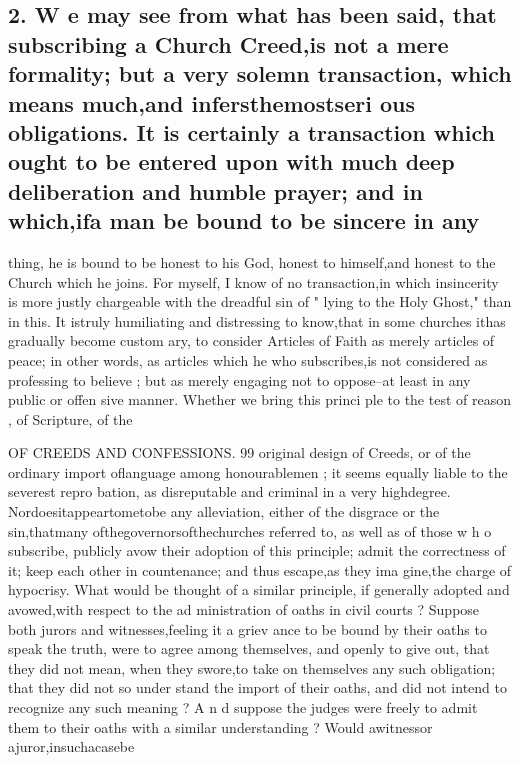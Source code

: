 \documentclass[
]{book}
\begin{document}
\hypertarget{w-e-may-see-from-what-has-been-said-that-subscribing-a-church-creedis-not-a-mere-formality-but-a-very-solemn-transaction-which-means-muchand-infersthemostseri-ous-obligations.-it-is-certainly-a-transaction-which-ought-to-be-entered-upon-with-much-deep-deliberation-and-humble-prayer-and-in-whichifa-man-be-bound-to-be-sincere-in-any}{%
\subsection{2. W e may see from what has been said, that subscribing a Church Creed,is not a mere formality; but a very solemn transaction, which means much,and infersthemostseri ous obligations. It is certainly a transaction which ought to be entered upon with much deep deliberation and humble prayer; and in which,ifa man be bound to be sincere in any}\label{w-e-may-see-from-what-has-been-said-that-subscribing-a-church-creedis-not-a-mere-formality-but-a-very-solemn-transaction-which-means-muchand-infersthemostseri-ous-obligations.-it-is-certainly-a-transaction-which-ought-to-be-entered-upon-with-much-deep-deliberation-and-humble-prayer-and-in-whichifa-man-be-bound-to-be-sincere-in-any}}

thing, he is bound to be honest to his God, honest to himself,and honest to the Church
which he joins. For myself, I know of no transaction,in which insincerity is more justly
chargeable with the dreadful sin of " lying to the Holy Ghost," than in this. It istruly
humiliating and distressing to know,that in some churches ithas gradually become custom ary, to consider Articles of Faith as merely articles of peace; in other words, as articles which he who subscribes,is not considered as professing to believe ; but as merely engaging not to oppose--at least in any public or offen sive manner. Whether we bring this princi
ple to the test of reason , of Scripture, of the

OF CREEDS AND CONFESSIONS. 99
original design of Creeds, or of the ordinary import oflanguage among honourablemen ; it seems equally liable to the severest repro bation, as disreputable and criminal in a very
highdegree. Nordoesitappeartometobe any alleviation, either of the disgrace or the
sin,thatmany ofthegovernorsofthechurches
referred to, as well as of those w h o subscribe,
publicly avow their adoption of this principle;
admit the correctness of it; keep each other
in countenance; and thus escape,as they ima
gine,the charge of hypocrisy. What would
be thought of a similar principle, if generally adopted and avowed,with respect to the ad
ministration of oaths in civil courts ? Suppose both jurors and witnesses,feeling it a griev ance to be bound by their oaths to speak the truth, were to agree among themselves, and openly to give out, that they did not mean, when they swore,to take on themselves any such obligation; that they did not so under
stand the import of their oaths, and did not intend to recognize any such meaning ? A n d suppose the judges were freely to admit them to their oaths with a similar understanding ? Would awitnessor ajuror,insuchacasebe
\end{document}
